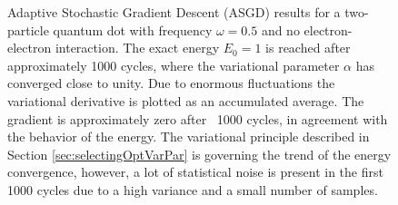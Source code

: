 \begin{figure}[h]
 \begin{center}
  \caption{Adaptive Stochastic Gradient Descent (ASGD) results for a two-particle quantum dot with frequency $\omega=0.5$ and no electron-electron interaction. The exact energy $E_0=1$ is reached after approximately 1000 cycles, where the variational parameter $\alpha$ has converged close to unity. Due to enormous fluctuations the variational derivative is plotted as an accumulated average. The gradient is approximately zero after ~1000 cycles, in agreement with the behavior of the energy. The variational principle described in Section \ref{sec:selectingOptVarPar} is governing the trend of the energy convergence, however, a lot of statistical noise is present in the first 1000 cycles due to a high variance and a small number of samples.}
  \label{fig:ASGD_nonint}
 \end{center}
\end{figure}



